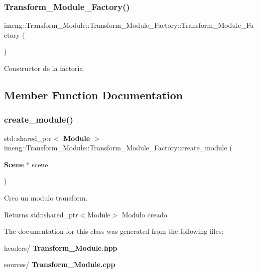 \subsubsection{Transform\_Module\_Factory()}
{\footnotesize\ttfamily imeng\+::\+Transform\+\_\+\+Module\+::\+Transform\+\_\+\+Module\+\_\+\+Factory\+::\+Transform\+\_\+\+Module\+\_\+\+Factory (\begin{DoxyParamCaption}{ }\end{DoxyParamCaption})}



Constructor de la factoria. 



\subsection{Member Function Documentation}
\mbox{\label{classimeng_1_1_transform___module_1_1_transform___module___factory_a820e63a7cca8361a179e3188b5f7618a}} 
\subsubsection{create\_module()}
{\footnotesize\ttfamily std\+::shared\+\_\+ptr$<$ \textbf{ Module} $>$ imeng\+::\+Transform\+\_\+\+Module\+::\+Transform\+\_\+\+Module\+\_\+\+Factory\+::create\+\_\+module (\begin{DoxyParamCaption}\item[{\textbf{ Scene} $\ast$}]{scene }\end{DoxyParamCaption})\hspace{0.3cm}{\ttfamily [override]}}



Crea un modulo transform. 

\begin{DoxyReturn}{Returns}
std\+::shared\+\_\+ptr$<$\+Module$>$ Modulo creado 
\end{DoxyReturn}


The documentation for this class was generated from the following files\+:\begin{DoxyCompactItemize}
\item 
headers/\textbf{ Transform\+\_\+\+Module.\+hpp}\item 
sources/\textbf{ Transform\+\_\+\+Module.\+cpp}\end{DoxyCompactItemize}
